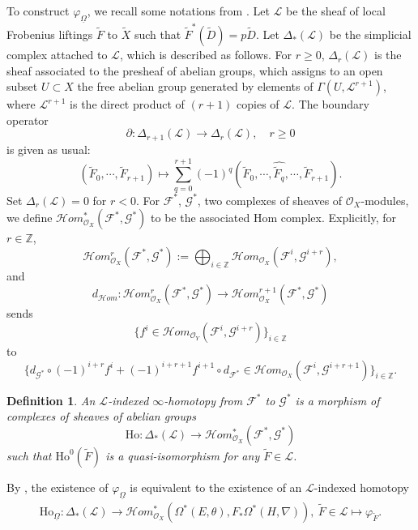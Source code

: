 \documentclass[12pt, a4paper]{article}
\newtheorem{definition}{Definition}[section]
\begin{document}
To construct $\varphi_{\underline\Omega}$, we recall some notations from \cite[\S3.1]{SZ2}. Let $\mathcal L$ be the sheaf of local Frobenius liftings $\tilde F$ to $\tilde X$ such that $\tilde F^*(\tilde D)=p\tilde D$. 
Let $\Delta_\ast(\mathcal L)$ be the simplicial complex attached to $\mathcal L$, which is described as follows. For $r \geq 0$, $\Delta_r(\mathcal L)$ is the sheaf associated to the presheaf of abelian groups, which assigns to an open subset $U \subset X$ the free abelian group generated by elements of $\Gamma(U, \mathcal L^{r+1})$, where $\mathcal L^{r+1}$ is the direct product of $(r + 1)$ copies of $\mathcal L$. The boundary operator 
\[
\partial : \Delta_{r+1}(\mathcal L) \to \Delta_r(\mathcal L), \quad r \geq 0
\]
is given as usual:
\[
(\tilde F_0, \cdots, \tilde F_{r+1}) \mapsto \sum_{q=0}^{r+1} (-1)^q (\tilde F_0, \cdots, \widehat{\tilde F_q}, \cdots, \tilde F_{r+1}).
\]
Set $\Delta_r(\mathcal L) = 0$ for $r < 0$. For \( \mathcal F^\ast \), \(\mathcal  G^\ast \), two complexes of sheaves of \(\mathcal{O}_X\)-modules,  
we define \(\mathcal Hom^\ast_{\mathcal{O}_X}(\mathcal F^\ast, \mathcal G^\ast)\) to be the associated Hom complex.  
Explicitly, for \( r \in \mathbb{Z} \),  
\[
\mathcal Hom^r_{\mathcal{O}_X}(\mathcal F^\ast, \mathcal G^\ast) := \bigoplus_{i \in \mathbb{Z}} 
\mathcal Hom_{\mathcal{O}_X}(\mathcal F^i, \mathcal G^{i+r}),
\]
and
\[
d_{\mathcal Hom} : \mathcal Hom^r_{\mathcal{O}_X}(\mathcal F^\ast, \mathcal G^\ast) 
\to \mathcal Hom^{r+1}_{\mathcal{O}_X}(\mathcal F^\ast, \mathcal G^\ast)
\]
sends 
\[
\{f^i \in \mathcal Hom_{\mathcal{O}_Y}(\mathcal F^i, \mathcal G^{i+r})\}_{i \in \mathbb{Z}}
\]
to
\[
\{d_{\mathcal G^\ast} \circ (-1)^{i+r}f^i + (-1)^{i+r+1} f^{i+1} \circ d_{\mathcal F^\ast} \in 
\mathcal Hom_{\mathcal{O}_X}(\mathcal F^i,\mathcal G^{i+r+1})\}_{i \in \mathbb{Z}}.
\]


\begin{definition}
 An $\mathcal L$-indexed $\infty$-homotopy from $\mathcal F^*$ to $\mathcal G^*$ is a morphism of complexes of sheaves of abelian groups
\[
\mathrm{Ho} : \Delta_\ast(\mathcal L) \to \mathcal Hom^\ast_{\mathcal{O}_X}(\mathcal F^*, \mathcal G^*)
\]
such that $\mathrm{Ho}^0(\tilde F)$ is a quasi-isomorphism for any $\tilde F\in\mathcal L$.
\end{definition}

By \cite[Proposition 3.2]{SZ2}, the existence of $\varphi_{\underline\Omega}$ is equivalent to the existence of an $\mathcal L$-indexed homotopy 
\begin{eqnarray}\label{L-indexed homotopy theta to nabla}
\mathrm{Ho}_{\underline\Omega}: \Delta_\ast(\mathcal L) \to \mathcal Hom^\ast_{\mathcal{O}_X}(\Omega^*(E,\theta), F_*\Omega^*(H,\nabla)),~\tilde F\in\mathcal L\mapsto\varphi_{\tilde F}.
\end{eqnarray}
\end{document}
